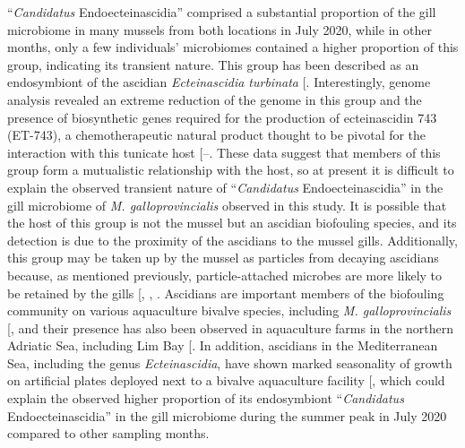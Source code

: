 \documentclass[
  12 pt,
]{article}
\begin{document}
``\emph{Candidatus} Endoecteinascidia'' comprised a substantial proportion of the gill microbiome in many mussels from both locations in July 2020, while in other months, only a few individuals' microbiomes contained a higher proportion of this group, indicating its transient nature. This group has been described as an endosymbiont of the ascidian \emph{Ecteinascidia turbinata} {[}\citeproc{ref-Moss2003}{125}{]}. Interestingly, genome analysis revealed an extreme reduction of the genome in this group and the presence of biosynthetic genes required for the production of ecteinascidin 743 (ET-743), a chemotherapeutic natural product thought to be pivotal for the interaction with this tunicate host {[}--\citeproc{ref-Schofield2015}{128}{]}. These data suggest that members of this group form a mutualistic relationship with the host, so at present it is difficult to explain the observed transient nature of ``\emph{Candidatus} Endoecteinascidia'' in the gill microbiome of \emph{M. galloprovincialis} observed in this study. It is possible that the host of this group is not the mussel but an ascidian biofouling species, and its detection is due to the proximity of the ascidians to the mussel gills. Additionally, this group may be taken up by the mussel as particles from decaying ascidians because, as mentioned previously, particle-attached microbes are more likely to be retained by the gills {[}, , \citeproc{ref-Ward1998}{98}{]}. Ascidians are important members of the biofouling community on various aquaculture bivalve species, including \emph{M. galloprovincialis} {[}\citeproc{ref-Alvanou2024}{129}{]}, and their presence has also been observed in aquaculture farms in the northern Adriatic Sea, including Lim Bay {[}\citeproc{ref-Majnaric2022}{130}{]}. In addition, ascidians in the Mediterranean Sea, including the genus \emph{Ecteinascidia}, have shown marked seasonality of growth on artificial plates deployed next to a bivalve aquaculture facility {[}\citeproc{ref-Casso2018}{131}{]}, which could explain the observed higher proportion of its endosymbiont ``\emph{Candidatus} Endoecteinascidia'' in the gill microbiome during the summer peak in July 2020 compared to other sampling months.
\end{document}
